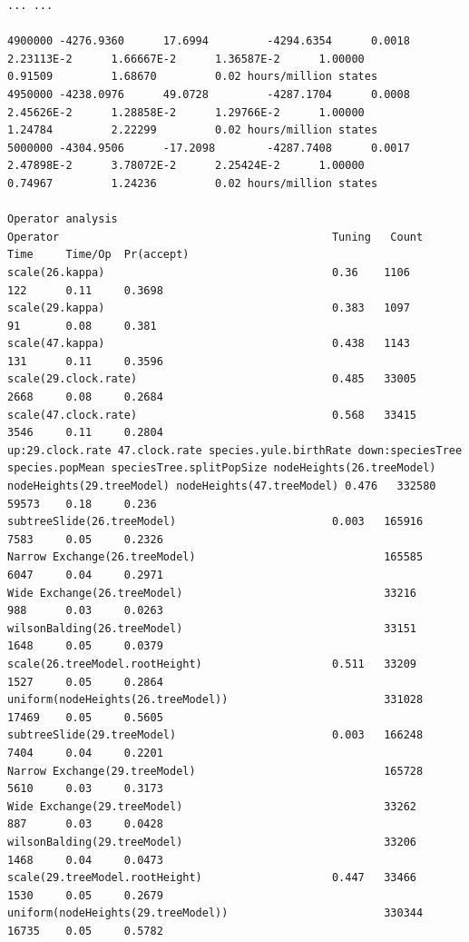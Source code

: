 \documentclass[12pt]{article}
\begin{document}
{\begin{verbatim}
... ...

4900000	-4276.9360  	17.6994     	-4294.6354  	0.0018      	2.23113E-2  	1.66667E-2  	1.36587E-2  	1.00000     	0.91509     	1.68670     	0.02 hours/million states
4950000	-4238.0976  	49.0728     	-4287.1704  	0.0008      	2.45626E-2  	1.28858E-2  	1.29766E-2  	1.00000     	1.24784     	2.22299     	0.02 hours/million states
5000000	-4304.9506  	-17.2098    	-4287.7408  	0.0017      	2.47898E-2  	3.78072E-2  	2.25424E-2  	1.00000     	0.74967     	1.24236     	0.02 hours/million states

Operator analysis
Operator                                          Tuning   Count      Time     Time/Op  Pr(accept) 
scale(26.kappa)                                   0.36    1106       122      0.11     0.3698      
scale(29.kappa)                                   0.383   1097       91       0.08     0.381       
scale(47.kappa)                                   0.438   1143       131      0.11     0.3596      
scale(29.clock.rate)                              0.485   33005      2668     0.08     0.2684      
scale(47.clock.rate)                              0.568   33415      3546     0.11     0.2804      
up:29.clock.rate 47.clock.rate species.yule.birthRate down:speciesTree species.popMean speciesTree.splitPopSize nodeHeights(26.treeModel) nodeHeights(29.treeModel) nodeHeights(47.treeModel) 0.476   332580     59573    0.18     0.236       
subtreeSlide(26.treeModel)                        0.003   165916     7583     0.05     0.2326      
Narrow Exchange(26.treeModel)                             165585     6047     0.04     0.2971      
Wide Exchange(26.treeModel)                               33216      988      0.03     0.0263      
wilsonBalding(26.treeModel)                               33151      1648     0.05     0.0379      
scale(26.treeModel.rootHeight)                    0.511   33209      1527     0.05     0.2864      
uniform(nodeHeights(26.treeModel))                        331028     17469    0.05     0.5605      
subtreeSlide(29.treeModel)                        0.003   166248     7404     0.04     0.2201      
Narrow Exchange(29.treeModel)                             165728     5610     0.03     0.3173      
Wide Exchange(29.treeModel)                               33262      887      0.03     0.0428      
wilsonBalding(29.treeModel)                               33206      1468     0.04     0.0473      
scale(29.treeModel.rootHeight)                    0.447   33466      1530     0.05     0.2679      
uniform(nodeHeights(29.treeModel))                        330344     16735    0.05     0.5782      

\end{verbatim}}
\end{document}
